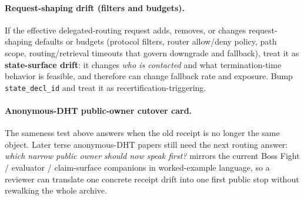 \documentclass[11pt]{article}
\begin{document}
\paragraph{Request-shaping drift (filters and budgets).}
If the effective delegated-routing request adds, removes, or changes request-shaping defaults or budgets (protocol filters, router allow/deny policy, path scope, routing/retrieval timeouts that govern downgrade and fallback), treat it as \textbf{state-surface drift}: it changes \emph{who is contacted} and what termination-time behavior is feasible, and therefore can change fallback rate and exposure.
Bump \texttt{state\_decl\_id} and treat it as recertification-triggering.\cite{series:deployedsurfaces,series:planstateequiv}

\paragraph{Anonymous-DHT public-owner cutover card.}
The sameness test above answers when the old receipt is no longer the same object.
Later terse anonymous-DHT papers still need the next routing answer: \emph{which narrow public owner should now speak first?}
 mirrors the current Boss Fight / evaluator / claim-surface companions in worked-example language, so a reviewer can translate one concrete receipt drift into one first public stop without rewalking the whole archive.\cite{series:bossfightA,series:bossfightB,series:bossfightC,series:evalnotary,series:abomoinl,series:releaseproperty}
\end{document}
